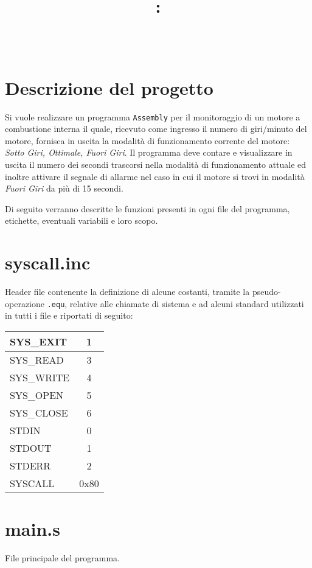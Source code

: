 \documentclass[a4paper,11pt]{article}
\title{
\vspace{2in}
\textmd{\textbf{\hmwkClass:\\ \hmwkTitle}}\\
\vspace{0.1in}\large{\textit{\hmwkAuthorName}}
\vspace{3in}
}
\newcommand{\Assembly}{\texttt{Assembly} }
\begin{document}
	\maketitle
	\newpage
	\tableofcontents
	\newpage
	
	\section{Descrizione del progetto}
	Si vuole realizzare un programma \Assembly per il monitoraggio di un motore a combustione interna il quale, ricevuto come ingresso il numero di giri/minuto del motore, fornisca in uscita la modalità di funzionamento corrente del motore: \textit{Sotto Giri, Ottimale, Fuori Giri}. Il programma deve contare e visualizzare in uscita il numero dei secondi trascorsi nella modalità di funzionamento attuale ed inoltre attivare il segnale di allarme nel caso in cui il motore si trovi in modalità \textit{Fuori Giri} da più di 15 secondi.
	
	\vspace {5mm}
	Di seguito verranno descritte le funzioni presenti in ogni file del programma, etichette, eventuali variabili e loro scopo. 
	
	\section{syscall.inc}
	Header file contenente la definizione di alcune costanti, tramite la pseudo-operazione \texttt{.equ}, relative alle chiamate di sistema e ad alcuni standard utilizzati in tutti i file e riportati di seguito:
	\begin{table}[!h]
		\begin{tabular}{| l | c |}
			\hline
			SYS\_EXIT & 1 \\ \hline
			SYS\_READ & 3 \\ \hline
			SYS\_WRITE & 4 \\ \hline
			SYS\_OPEN & 5 \\ \hline
			SYS\_CLOSE & 6 \\ \hline
			STDIN & 0 \\ \hline
			STDOUT & 1 \\ \hline
			STDERR & 2			 \\ \hline
			SYSCALL & 0x80 \\ \hline
		\end{tabular}
	\end{table}
	
	\section{main.s}
	File principale del programma. 
	
\end{document}
